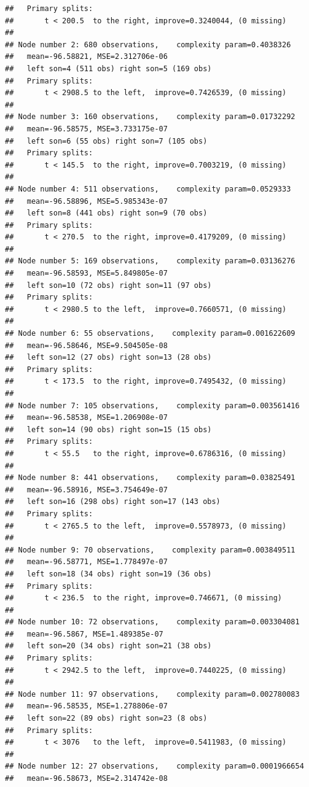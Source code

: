 \documentclass[
]{book}
\begin{document}
\begin{verbatim}
##   Primary splits:
##       t < 200.5  to the right, improve=0.3240044, (0 missing)
## 
## Node number 2: 680 observations,    complexity param=0.4038326
##   mean=-96.58821, MSE=2.312706e-06 
##   left son=4 (511 obs) right son=5 (169 obs)
##   Primary splits:
##       t < 2908.5 to the left,  improve=0.7426539, (0 missing)
## 
## Node number 3: 160 observations,    complexity param=0.01732292
##   mean=-96.58575, MSE=3.733175e-07 
##   left son=6 (55 obs) right son=7 (105 obs)
##   Primary splits:
##       t < 145.5  to the right, improve=0.7003219, (0 missing)
## 
## Node number 4: 511 observations,    complexity param=0.0529333
##   mean=-96.58896, MSE=5.985343e-07 
##   left son=8 (441 obs) right son=9 (70 obs)
##   Primary splits:
##       t < 270.5  to the right, improve=0.4179209, (0 missing)
## 
## Node number 5: 169 observations,    complexity param=0.03136276
##   mean=-96.58593, MSE=5.849805e-07 
##   left son=10 (72 obs) right son=11 (97 obs)
##   Primary splits:
##       t < 2980.5 to the left,  improve=0.7660571, (0 missing)
## 
## Node number 6: 55 observations,    complexity param=0.001622609
##   mean=-96.58646, MSE=9.504505e-08 
##   left son=12 (27 obs) right son=13 (28 obs)
##   Primary splits:
##       t < 173.5  to the right, improve=0.7495432, (0 missing)
## 
## Node number 7: 105 observations,    complexity param=0.003561416
##   mean=-96.58538, MSE=1.206908e-07 
##   left son=14 (90 obs) right son=15 (15 obs)
##   Primary splits:
##       t < 55.5   to the right, improve=0.6786316, (0 missing)
## 
## Node number 8: 441 observations,    complexity param=0.03825491
##   mean=-96.58916, MSE=3.754649e-07 
##   left son=16 (298 obs) right son=17 (143 obs)
##   Primary splits:
##       t < 2765.5 to the left,  improve=0.5578973, (0 missing)
## 
## Node number 9: 70 observations,    complexity param=0.003849511
##   mean=-96.58771, MSE=1.778497e-07 
##   left son=18 (34 obs) right son=19 (36 obs)
##   Primary splits:
##       t < 236.5  to the right, improve=0.746671, (0 missing)
## 
## Node number 10: 72 observations,    complexity param=0.003304081
##   mean=-96.5867, MSE=1.489385e-07 
##   left son=20 (34 obs) right son=21 (38 obs)
##   Primary splits:
##       t < 2942.5 to the left,  improve=0.7440225, (0 missing)
## 
## Node number 11: 97 observations,    complexity param=0.002780083
##   mean=-96.58535, MSE=1.278806e-07 
##   left son=22 (89 obs) right son=23 (8 obs)
##   Primary splits:
##       t < 3076   to the left,  improve=0.5411983, (0 missing)
## 
## Node number 12: 27 observations,    complexity param=0.0001966654
##   mean=-96.58673, MSE=2.314742e-08 

\end{verbatim}
\end{document}
